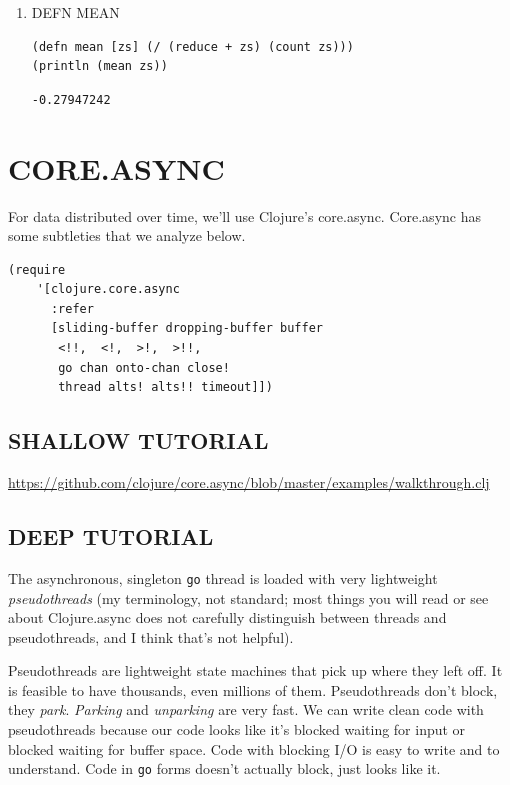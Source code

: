 \documentclass[10pt,oneside,x11names]{article}
\begin{document}
\begin{enumerate}
\item DEFN MEAN
\label{sec:org68284cb}

\begin{verbatim}
(defn mean [zs] (/ (reduce + zs) (count zs)))
(println (mean zs))
\end{verbatim}

\begin{verbatim}
-0.27947242
\end{verbatim}
\end{enumerate}

\section{CORE.ASYNC}
\label{core.async}
For data distributed over time, we'll use Clojure's core.async.
Core.async has some subtleties that we analyze below.

\begin{verbatim}
(require
    '[clojure.core.async
      :refer
      [sliding-buffer dropping-buffer buffer
       <!!,  <!,  >!,  >!!,
       go chan onto-chan close!
       thread alts! alts!! timeout]])
\end{verbatim}

\subsection{SHALLOW TUTORIAL}
\label{shallow-tutorial}
\url{https://github.com/clojure/core.async/blob/master/examples/walkthrough.clj}

\subsection{DEEP TUTORIAL}
\label{deep-tutorial}
The asynchronous, singleton \texttt{go} thread is loaded with very lightweight
\emph{pseudothreads} (my terminology, not standard; most things you will read
or see about Clojure.async does not carefully distinguish between
threads and pseudothreads, and I think that's not helpful).

Pseudothreads are lightweight state machines that pick up where they
left off. It is feasible to have thousands, even millions of them.
Pseudothreads don't block, they \emph{park}. \emph{Parking} and \emph{unparking} are
very fast. We can write clean code with pseudothreads because our code
looks like it's blocked waiting for input or blocked waiting for buffer
space. Code with blocking I/O is easy to write and to understand. Code
in \texttt{go} forms doesn't actually block, just looks like it.
\end{document}

